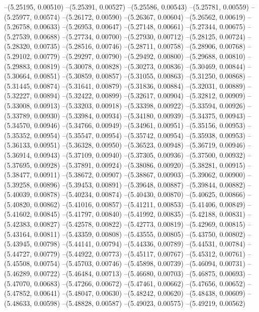 --(5.25195, 0.00510)
--(5.25391, 0.00527)
--(5.25586, 0.00543)
--(5.25781, 0.00559)
--(5.25977, 0.00574)
--(5.26172, 0.00590)
--(5.26367, 0.00604)
--(5.26562, 0.00619)
--(5.26758, 0.00633)
--(5.26953, 0.00647)
--(5.27148, 0.00661)
--(5.27344, 0.00675)
--(5.27539, 0.00688)
--(5.27734, 0.00700)
--(5.27930, 0.00712)
--(5.28125, 0.00724)
--(5.28320, 0.00735)
--(5.28516, 0.00746)
--(5.28711, 0.00758)
--(5.28906, 0.00768)
--(5.29102, 0.00779)
--(5.29297, 0.00790)
--(5.29492, 0.00800)
--(5.29688, 0.00810)
--(5.29883, 0.00819)
--(5.30078, 0.00828)
--(5.30273, 0.00836)
--(5.30469, 0.00844)
--(5.30664, 0.00851)
--(5.30859, 0.00857)
--(5.31055, 0.00863)
--(5.31250, 0.00868)
--(5.31445, 0.00874)
--(5.31641, 0.00879)
--(5.31836, 0.00884)
--(5.32031, 0.00889)
--(5.32227, 0.00894)
--(5.32422, 0.00899)
--(5.32617, 0.00904)
--(5.32812, 0.00909)
--(5.33008, 0.00913)
--(5.33203, 0.00918)
--(5.33398, 0.00922)
--(5.33594, 0.00926)
--(5.33789, 0.00930)
--(5.33984, 0.00934)
--(5.34180, 0.00939)
--(5.34375, 0.00943)
--(5.34570, 0.00946)
--(5.34766, 0.00949)
--(5.34961, 0.00951)
--(5.35156, 0.00953)
--(5.35352, 0.00954)
--(5.35547, 0.00954)
--(5.35742, 0.00954)
--(5.35938, 0.00953)
--(5.36133, 0.00951)
--(5.36328, 0.00950)
--(5.36523, 0.00948)
--(5.36719, 0.00946)
--(5.36914, 0.00943)
--(5.37109, 0.00940)
--(5.37305, 0.00936)
--(5.37500, 0.00932)
--(5.37695, 0.00928)
--(5.37891, 0.00924)
--(5.38086, 0.00920)
--(5.38281, 0.00915)
--(5.38477, 0.00911)
--(5.38672, 0.00907)
--(5.38867, 0.00903)
--(5.39062, 0.00900)
--(5.39258, 0.00896)
--(5.39453, 0.00891)
--(5.39648, 0.00887)
--(5.39844, 0.00882)
--(5.40039, 0.00878)
--(5.40234, 0.00874)
--(5.40430, 0.00870)
--(5.40625, 0.00866)
--(5.40820, 0.00862)
--(5.41016, 0.00857)
--(5.41211, 0.00853)
--(5.41406, 0.00849)
--(5.41602, 0.00845)
--(5.41797, 0.00840)
--(5.41992, 0.00835)
--(5.42188, 0.00831)
--(5.42383, 0.00827)
--(5.42578, 0.00822)
--(5.42773, 0.00819)
--(5.42969, 0.00815)
--(5.43164, 0.00811)
--(5.43359, 0.00808)
--(5.43555, 0.00805)
--(5.43750, 0.00802)
--(5.43945, 0.00798)
--(5.44141, 0.00794)
--(5.44336, 0.00789)
--(5.44531, 0.00784)
--(5.44727, 0.00779)
--(5.44922, 0.00773)
--(5.45117, 0.00767)
--(5.45312, 0.00761)
--(5.45508, 0.00754)
--(5.45703, 0.00746)
--(5.45898, 0.00739)
--(5.46094, 0.00731)
--(5.46289, 0.00722)
--(5.46484, 0.00713)
--(5.46680, 0.00703)
--(5.46875, 0.00693)
--(5.47070, 0.00683)
--(5.47266, 0.00672)
--(5.47461, 0.00662)
--(5.47656, 0.00652)
--(5.47852, 0.00641)
--(5.48047, 0.00630)
--(5.48242, 0.00620)
--(5.48438, 0.00609)
--(5.48633, 0.00598)
--(5.48828, 0.00587)
--(5.49023, 0.00575)
--(5.49219, 0.00562)

